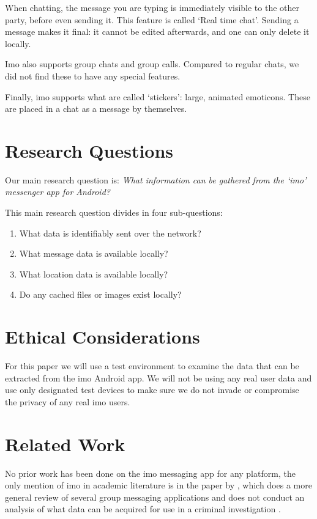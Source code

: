\documentclass[conference]{IEEEtran}
\begin{document}
When chatting, the message you are typing is immediately visible to the other
party, before even sending it. This feature is called `Real time chat'. Sending
a message makes it final: it cannot be edited afterwards, and one can only
delete it locally.

Imo also supports group chats and group calls. Compared to regular chats, we
did not find these to have any special features.

Finally, imo supports what are called `stickers': large, animated emoticons.
These are placed in a chat as a message by themselves.


\section{Research Questions}\label{sec:researchq}

Our main research question is:
{\it What information can be gathered from the `imo' messenger app for Android?}

This main research question divides in four sub-questions:

\begin{enumerate}
    \item What data is identifiably sent over the network?
    \item What message data is available locally?
    \item What location data is available locally?
    \item Do any cached files or images exist locally?
\end{enumerate}


\section{Ethical Considerations}\label{sec:ethics}

For this paper we will use a test environment to examine the data that can be
extracted from the imo Android app. We will not be using any real user data and
use only designated test devices to make sure we do not invade or compromise the
privacy of any real imo users.


\section{Related Work}\label{sec:relwork}

No prior work has been done on the imo messaging app for any platform, the only
mention of imo in academic literature is in the paper by \citeauthor{zhu}, which
does a more general review of several group messaging applications and does not
conduct an analysis of what data can be acquired for use in a criminal
investigation \cite{zhu}.
\end{document}

